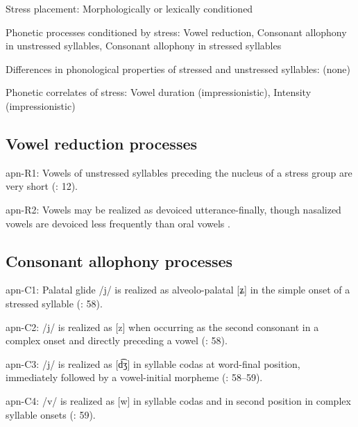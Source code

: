 {\begin{appendixdesc}
\item[Stress placement:] Morphologically or lexically conditioned

\item[Phonetic processes conditioned by stress:] Vowel reduction, Consonant allophony in unstressed syllables, Consonant allophony in stressed syllables

\item[Differences in phonological properties of stressed and unstressed syllables:] (none)

\item[Phonetic correlates of stress:] Vowel duration (impressionistic), Intensity (impressionistic)
\end{appendixdesc}
\subsection*{Vowel reduction processes}
\begin{appendixdesc}

\item[apn-R1:] Vowels of unstressed syllables preceding the nucleus of a stress group are very short (\citealt{BurgessHam1968}: 12).

\item[apn-R2:] Vowels may be realized as devoiced utterance-finally, though nasalized vowels are devoiced less frequently than oral vowels \citep[7]{Ham2009}.
\end{appendixdesc}
\subsection*{Consonant allophony processes}
\begin{appendixdesc}

\item[apn-C1:] Palatal glide /j/ is realized as alveolo-palatal [ʑ] in the simple onset of a stressed syllable (\citealt{CunhadeOliveira2005}: 58).

\item[apn-C2:] /j/ is realized as [z] when occurring as the second consonant in a complex onset and directly preceding a vowel (\citealt{CunhadeOliveira2005}: 58).

\item[apn-C3:] /j/ is realized as [d͡ʒ] in syllable codas at word-final position, immediately followed by a vowel-initial morpheme (\citealt{CunhadeOliveira2005}: 58--59).

\item[apn-C4:] /v/ is realized as [w] in syllable codas and in second position in complex syllable onsets (\citealt{CunhadeOliveira2005}: 59).


\end{appendixdesc}}
